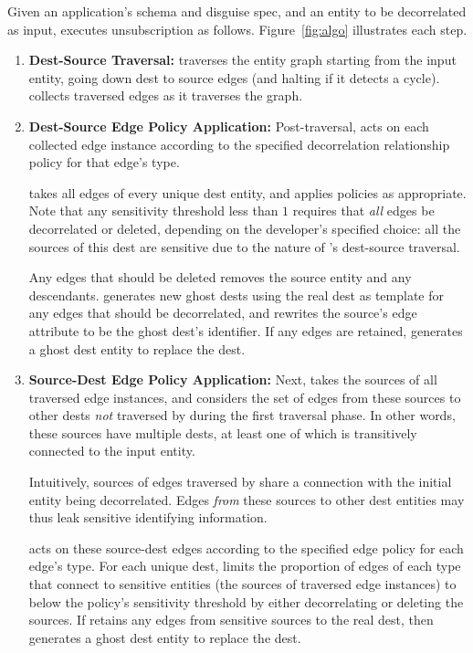 Given an application's schema and disguise spec, and an entity to be decorrelated as input,
\sys executes unsubscription as follows. Figure~\ref{fig:algo} illustrates each step.
\begin{enumerate}
    \item \textbf{Dest-Source Traversal:} \sys traverses the entity graph starting from the input entity,
        going down dest to source edges (and halting if it detects a cycle).
        \sys collects traversed edges as it traverses the graph.

    \item \textbf{Dest-Source Edge Policy Application:}
        Post-traversal, \sys acts on each collected edge instance according to the specified
        decorrelation relationship policy for that edge's type.

        \sys takes all edges of every unique dest entity, and applies policies as appropriate.
        Note that any sensitivity threshold less than $1$ requires that \emph{all} edges be decorrelated or
        deleted, depending on the developer's specified choice: all the sources of this dest are
        sensitive due to the nature of \sys's dest-source traversal.

        Any edges that should be deleted removes the source entity and any descendants.
        \sys generates new ghost dests using the real dest as template for any edges that should
        be decorrelated, and rewrites the source's edge attribute to be the ghost dest's
        identifier. If any edges are retained, \sys generates a ghost dest entity to replace the
        dest.

    \item \textbf{Source-Dest Edge Policy Application:}
        Next, \sys takes the sources of all traversed edge instances, and considers the set of
        edges from these sources to other dests \emph{not} traversed by \sys during the first
        traversal phase. In other words, these sources have multiple dests, at least one of which
        is transitively connected to the input entity.

        Intuitively, sources of edges traversed by \sys share a connection with the initial
        entity being decorrelated. Edges \emph{from} these sources to other dest entities may
        thus leak sensitive identifying information.

        \sys acts on these source-dest edges according to the specified edge policy for each edge's
        type. For each unique dest, \sys limits the proportion of edges of each type that connect
        to sensitive entities (the sources of traversed edge instances) to below the policy's
        sensitivity threshold by either decorrelating or deleting the sources.
        If \sys retains any edges from sensitive sources to the real dest, then \sys generates a
        ghost dest entity to replace the dest.


\end{enumerate}
